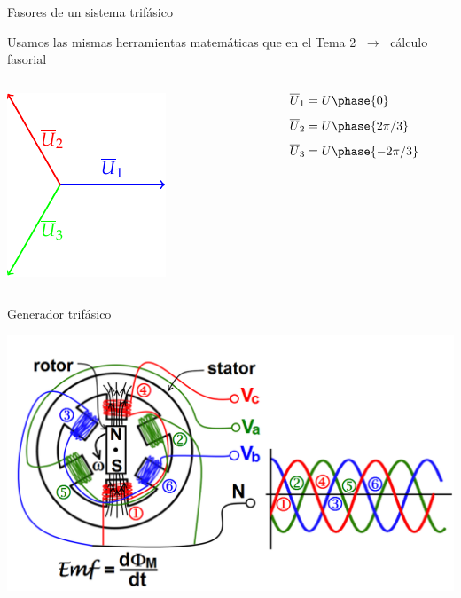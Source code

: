 \documentclass[aspectratio=169, usenames,svgnames,dvipsnames]{beamer}
\begin{document}
\begin{frame}{Fasores de un sistema trifásico}
    \vspace{1mm}
    
    Usamos las mismas herramientas matemáticas que en el Tema 2 $\; \rightarrow \;$ \alert{cálculo fasorial}
    

    \vspace{8mm}
    \begin{columns}
    \begin{column}{0.35\columnwidth}
        \hspace*{35mm}
            \includegraphics[height=0.5\textheight]{../figs/FasoresTrifasica.pdf}
    \end{column}    
    \begin{column}{0.65\columnwidth}
        \vspace{-0.1mm}
        \begin{align*}
          \overline{U}_1 &= U\phase{0}\\[4pt]
          \overline{U}_2 &= U\phase{2\pi/3}\\[4pt]
          \overline{U}_3 &= U\phase{-2\pi/3}
        \end{align*}
    \end{column}
    \end{columns}
\end{frame}


\begin{frame}{Generador trifásico}
    \begin{center}
        \includegraphics[width=.7\linewidth]{../figs/generador_trifasico.png}
    \end{center}
\end{frame}
\end{document}

